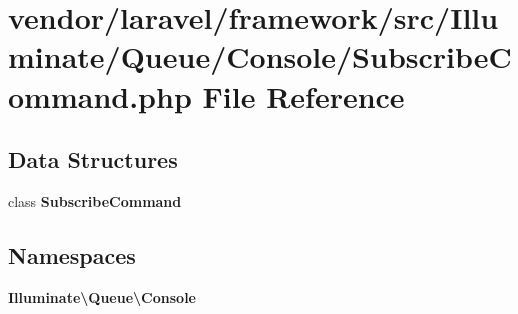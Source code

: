 \section{vendor/laravel/framework/src/\+Illuminate/\+Queue/\+Console/\+Subscribe\+Command.php File Reference}
\label{_subscribe_command_8php}
\subsection*{Data Structures}
\begin{DoxyCompactItemize}
\item 
class {\bf Subscribe\+Command}
\end{DoxyCompactItemize}
\subsection*{Namespaces}
\begin{DoxyCompactItemize}
\item 
 {\bf Illuminate\textbackslash{}\+Queue\textbackslash{}\+Console}
\end{DoxyCompactItemize}
